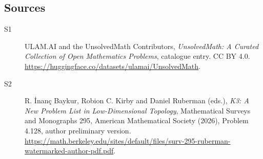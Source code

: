 \documentclass[11pt]{article}
\begin{document}
\subsection{Sources}
\begin{description}
\item[\hypertarget{source:statement:1}{S1}] ULAM.AI and the UnsolvedMath Contributors, \emph{UnsolvedMath: A Curated Collection of Open Mathematics Problems}, catalogue entry. CC BY 4.0. \url{https://huggingface.co/datasets/ulamai/UnsolvedMath}.
\item[\hypertarget{source:statement:2}{S2}] R. İnanç Baykur, Robion C. Kirby and Daniel Ruberman (eds.), \emph{K3: A New Problem List in Low-Dimensional Topology}, Mathematical Surveys and Monographs 295, American Mathematical Society (2026), Problem 4.128, author preliminary version. \url{https://math.berkeley.edu/sites/default/files/surv-295-ruberman-watermarked-author-pdf.pdf}.
\end{description}
\label{end:statement}
\end{document}
